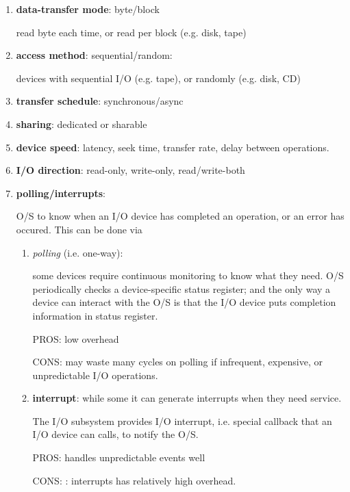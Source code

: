 \begin{enumerate}
  
  \item {\bf data-transfer mode}: byte/block 
  
  read byte each time, or read per block (e.g. disk, tape)
  
  
  \item {\bf access method}: sequential/random:
  
  devices with sequential  I/O (e.g. tape), or randomly (e.g. disk, CD)
  
  \item {\bf transfer schedule}: synchronous/async
  
  \item {\bf sharing}: dedicated or sharable
  
  \item {\bf device speed}: latency, seek time, transfer rate, delay between
  operations.
  
  
  \item {\bf I/O direction}: read-only, write-only, read/write-both
  
  \item {\bf polling/interrupts}:
  
O/S to know when an I/O device has completed an
operation, or an error has occured. This can be done via 
\begin{enumerate}
  \item {\it polling} (i.e. one-way):  
  
some devices require continuous monitoring to know what they need.
O/S periodically checks a device-specific status register; and the only way a
device can interact with the O/S is that the I/O device puts completion
information in status register.

PROS: low overhead

CONS: may waste many cycles on polling if infrequent, expensive, or
unpredictable I/O operations.
 
  \item {\bf interrupt}: while some it can generate interrupts when they need
  service.
  
The I/O subsystem provides I/O interrupt, i.e. special callback that an I/O
device can calls, to notify the O/S. 

PROS:  handles unpredictable events well

CONS: :	interrupts	has relatively high	overhead.
\end{enumerate}		
\end{enumerate}

